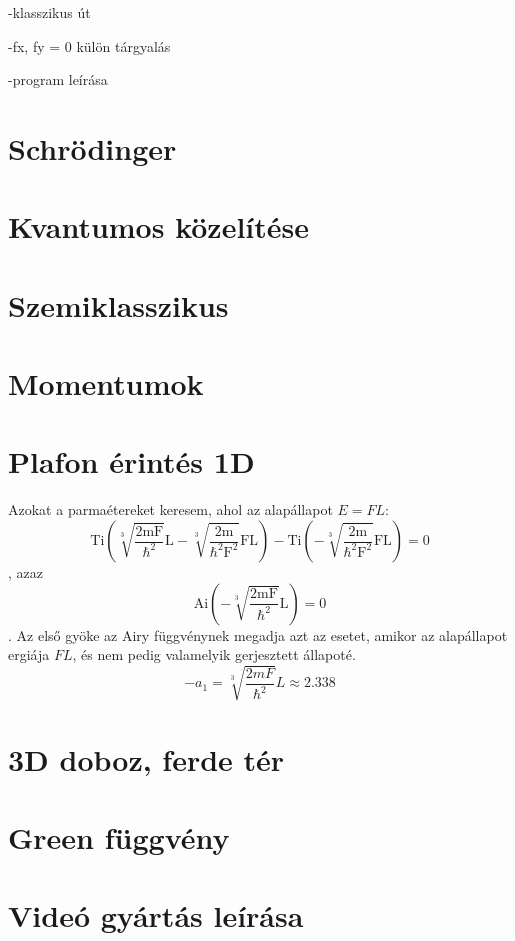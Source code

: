 \documentclass[a4paper,titlepage]{article}
\newcommand{\Ai}[1]{\mathrm{Ai\left(#1\right)}}
\newcommand{\Ti}[1]{\mathrm{Ti\left(#1\right)}}
\begin{document}
	-klasszikus út
	
	-fx, fy = 0 külön tárgyalás
	
	-program leírása
\section{Schrödinger}
	
\section{Kvantumos közelítése}
	
\section{Szemiklasszikus}
	
\section{Momentumok}
	
	
\section{Plafon érintés 1D}
	Azokat a parmaétereket keresem, ahol az alapállapot $E = FL$:
	\begin{equation}
		\Ti{\sqrt[3]{\frac{2mF}{\hbar^2}}L - \sqrt[3]{\frac{2m}{\hbar^2F^2}}FL} - \Ti{-\sqrt[3]{\frac{2m}{\hbar^2F^2}}FL} = 0
	\end{equation}
	, azaz
	\begin{equation}
		\Ai{-\sqrt[3]{\frac{2mF}{\hbar^2}}L} = 0
	\end{equation}
	. Az első gyöke az Airy függvénynek megadja azt az esetet, amikor az alapállapot ergiája $FL$, és nem pedig valamelyik gerjesztett állapoté.
	\begin{equation}
		-a_1 = \sqrt[3]{\frac{2mF}{\hbar^2}}L \approx 2.338
	\end{equation}



\section{3D doboz, ferde tér}
    
    
\section{Green függvény}
    
\section{Videó gyártás leírása}
    
    
    
\end{document}
